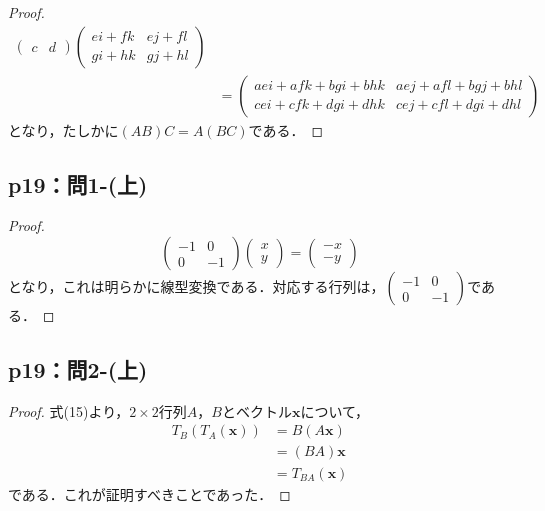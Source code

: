 \documentclass[uplatex,dvipdfmx,a4paper,10pt,fleqn]{jsarticle}
\begin{document}
\begin{tleftbar}
\begin{proof}
\begin{align*}
\begin{pmatrix}
                    c & d
                \end{pmatrix}
                \begin{pmatrix}
                    ei + fk & ej +fl \\
                    gi + hk & gj +hl 
                \end{pmatrix}
                \\
                & =
                \begin{pmatrix}
                    aei + afk +bgi +bhk & aej +afl +bgj +bhl \\
                    cei + cfk + dgi +dhk & cej + cfl + dgi +dhl
                \end{pmatrix}
            \end{align*}
            となり，たしかに$(AB)C=A(BC)$である．
        \end{proof}
    \end{tleftbar}
%
\newpage
\subsection*{p19：問1-(上)}
%
\begin{tleftbar}
	\begin{proof}
		\[
			\begin{pmatrix}
				-1 & 0\\
				0 & -1
			\end{pmatrix}
				\begin{pmatrix}
					x \\
					y 
				\end{pmatrix}
			=
				\begin{pmatrix}
					-x \\
					-y 
				\end{pmatrix}
			\]
			となり，これは明らかに線型変換である．対応する行列は，$
			\begin{pmatrix}
				-1 & 0 \\
				0 & -1
			\end{pmatrix}
			$である．
		\end{proof}
	\end{tleftbar}

    \subsection*{p19：問2-(上)}
	\begin{tleftbar}
		\begin{proof}
			式(15)より，$2 \times 2$行列$A$，$B$とベクトル$\bm{x}$について，
			\begin{align*}
				T_B (T_A (\bm{x})) &= B(A\bm{x}) \\
				& = (BA) \bm{x} \\
				& = T_{BA} (\bm{x})
			\end{align*}
			である．これが証明すべきことであった．
		\end{proof}
    \end{tleftbar}
\end{document}
